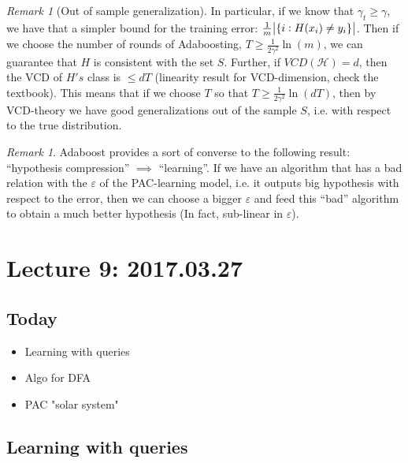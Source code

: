 \documentclass[12pt, letterpaper]{article}
\numberwithin{equation}{section} %
\newcommand{\mc}{\mathcal}
\newcommand{\ve}{\varepsilon}
\theoremstyle{definition}
\theoremstyle{remark}
\newtheorem{remark}[theorem]{Remark}
\begin{document}
\begin{remark}[Out of sample generalization]
In particular, if we know that $\gamma_t \geq \gamma$, we have that a simpler bound for the training error: $\frac1m\abs{\lbrace i : H(x_i) \ne y_i \rbrace} $. Then if we choose the number of rounds of Adaboosting, $T\geq \frac1{2\gamma^2}\ln(m)$, we can guarantee that $H$ is consistent with the set $S$. Further, if $VCD(\mc H) = d$, then the VCD of $H's$ class is $\leq dT$ (linearity result for VCD-dimension, check the textbook). This means that if we choose $T$ so that $T\geq \frac1{2\gamma^2}\ln(dT)$, then by VCD-theory we have good generalizations out of the sample $S$, i.e. with respect to the true distribution.
\end{remark}

\begin{remark}
Adaboost provides a sort of converse to the following result: ``hypothesis compression'' $\implies$ ``learning''. If we have an algorithm that has a bad relation with the $\ve$ of the PAC-learning model, i.e. it outputs big hypothesis with respect to the error, then we can choose a bigger $\ve$ and feed this ``bad'' algorithm to obtain a much better hypothesis (In fact, sub-linear in $\ve$).
\end{remark}

\section{Lecture 9: 2017.03.27}
\subsection*{Today}
\begin{itemize}
\item Learning with queries
\item Algo for DFA
\item PAC "solar system"
\end{itemize}

\subsection{Learning with queries}
\end{document}
